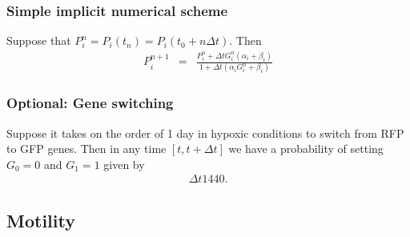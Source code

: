 \documentclass[12pt]{article}
\newcommand{\beqa}{\begin{eqnarray}}
\newcommand{\eeqa}{\end{eqnarray}}
\begin{document}
\subsubsection{Simple implicit numerical scheme}
Suppose that $P_i^n = P_i( t_n ) = P_i ( t_0 + n \Delta t)$. Then 
\beqa
P^{n+1}_i 
& = & 
\frac{ P_i^n + \Delta t G_i^n \left( \alpha_i + \beta_i \right) }{ 1 + \Delta t \left( \alpha_i G_i^n + \beta_i \right)}
\eeqa

\subsubsection{Optional: Gene switching}
Suppose it takes on the order of 1 day in hypoxic conditions to switch from RFP to GFP genes. Then in any 
time $[t , t+\Delta t]$ we have a probability of setting $G_0 = 0$ and $G_1 = 1$ given by 
\beqa
{\Delta t }{1440}. 
\eeqa


\subsection{Motility}
\end{document}
